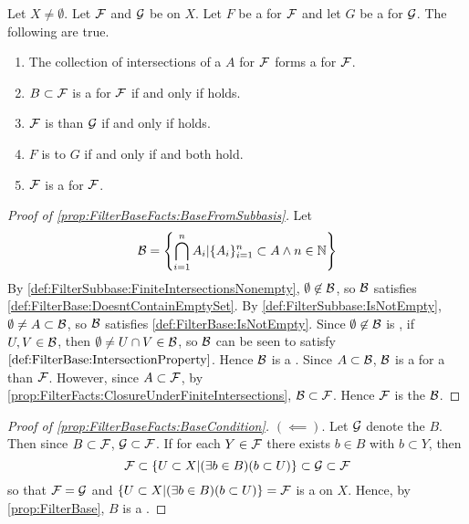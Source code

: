 \begin{prop}[FilterBaseFacts]
\label{prop:FilterBaseFacts}
   Let $X \neq \emptyset$. 
   Let $\mathcal{F}$ and $\mathcal{G}$ be \Filters on $X$. 
   Let $F$ be a \FilterBase for $\mathcal{F}$ and let 
   $G$ be a \FilterBase for $\mathcal{G}$. 
   The following are true. 
   \begin{enumerate}[label=(\roman*), ref={\ref{prop:FilterBaseFacts}.~\roman*}]
    \item \label{prop:FilterBaseFacts:BaseFromSubbasis}
        The collection of \Finite intersections of a 
        \FilterSubbasis $A$ for $\mathcal{F}$ 
        forms a \FilterBase for $\mathcal{F}$. 
    \item \label{prop:FilterBaseFacts:BaseCondition}
    $B \subset \mathcal{F}$ is a \FilterBase for $\mathcal{F}$ 
    if and only if  holds. 
    \item \label{prop:FilterBaseFacts:FinerCondition}
       $\mathcal{F}$ 
       is \FinerFilter than $\mathcal{G}$ if and only if  holds. 
    \item  \label{prop:FilterBaseFact:EquivalenceCondition} 
    $F$ is 
    \FilterBaseEquivalent to 
    $G$ if and only if  and  both hold.
    \item \label{prop:FilterBaseFacts:FiltersAreFilterBases}
    $\mathcal{F}$ is a \FilterBase for $\mathcal{F}$. 
   \end{enumerate}
   \begin{proof}[Proof of \ref{prop:FilterBaseFacts:BaseFromSubbasis}]
   Let 
   \begin{equation}
    \mathcal{B} = \left\{ \bigcap\limits_{i=1}^n A_i | \{A_i\}_{i=1}^n \subset A \wedge n \in \mathbb{N}\right\}
   \end{equation}
   By \ref{def:FilterSubbase:FiniteIntersectionsNonempty}, $\emptyset \not \in \mathcal{B}$, so $\mathcal{B}$ satisfies \ref{def:FilterBase:DoesntContainEmptySet}. 
   By \ref{def:FilterSubbase:IsNotEmpty}, $\emptyset \neq A \subset \mathcal{B}$, so $\mathcal{B}$ satisfies \ref{def:FilterBase:IsNotEmpty}. 
   Since $\emptyset \not \in \mathcal{B}$ is \ClosedUnderFiniteIntersections, if $U,V \in \mathcal{B}$, then $\emptyset \neq U \cap V \in \mathcal{B}$, so $\mathcal{B}$ can be seen to satisfy $\ref{def:FilterBase:IntersectionProperty}$. Hence $\mathcal{B}$ is a \FilterBase. 
   Since $A \subset \mathcal{B}$, $\mathcal{B}$ is a \FilterBase for a \FinerFilter than $\mathcal{F}$. 
   However, since $A \subset \mathcal{F}$, 
   by \ref{prop:FilterFacts:ClosureUnderFiniteIntersections}, $\mathcal{B} \subset \mathcal{F}$. 
   Hence $\mathcal{F}$ is the \Filter
   \FilterGeneratedBy $\mathcal{B}$. 
   \end{proof}
   \begin{proof}[Proof of \ref{prop:FilterBaseFacts:BaseCondition}]
    $(\impliedby)$. Let $\mathcal{G}$ denote the \Filter \FilterGeneratedBy $B$. 
    Then since $B \subset \mathcal{F}$, $\mathcal{G} \subset \mathcal{F}$. 
    If for each $Y \in \mathcal{F}$ there exists $b \in B$ with $b \subset Y$, then 
    \begin{equation}
    \mathcal{F} \subset \{U \subset X | (\exists b \in B) (b \subset U) \} \subset \mathcal{G} \subset \mathcal{F}
    \end{equation}
    so that $\mathcal{F} = \mathcal{G}$ and 
    $\{U \subset X | (\exists b \in B) (b \subset U)\}= \mathcal{F}$ is a \Filter on $X$. 
    Hence, by  \ref{prop:FilterBase}, $B$ is a \Filter. 


\end{proof}
\end{prop}
